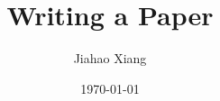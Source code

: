 \documentclass{beamer}
\title{Writing a Paper}
\author{Jiahao Xiang\inst{1}}
\institute{
    \inst{1}
    Hengyang Normal University
}
\date{\today}
\begin{document}
\begin{frame}
    \titlepage
\end{frame}
\end{document}
